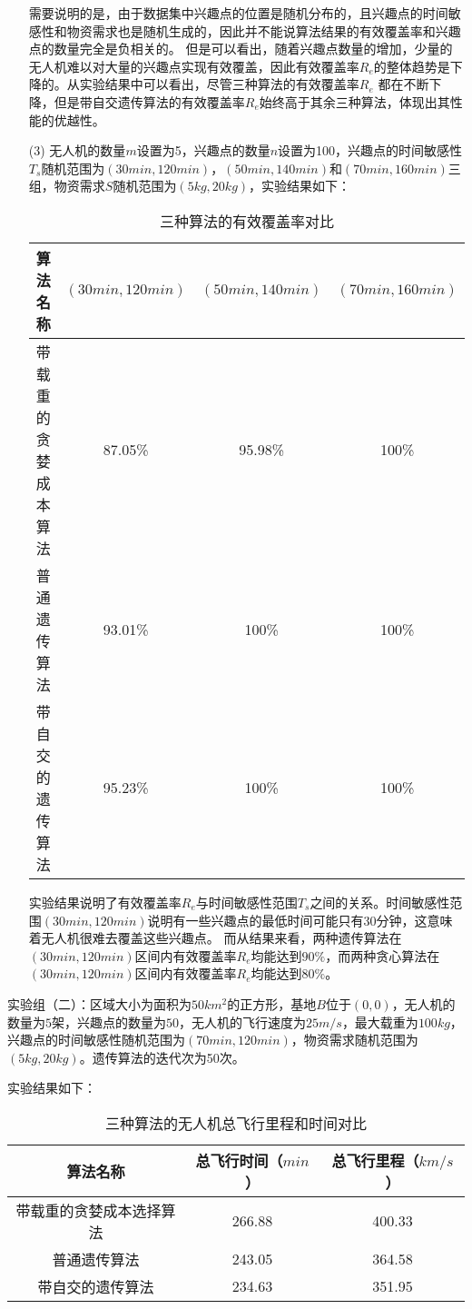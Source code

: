 \begin{itemize}
    需要说明的是，由于数据集中兴趣点的位置是随机分布的，且兴趣点的时间敏感性和物资需求也是随机生成的，因此并不能说算法结果的有效覆盖率和兴趣点的数量完全是负相关的。
    但是可以看出，随着兴趣点数量的增加，少量的无人机难以对大量的兴趣点实现有效覆盖，因此有效覆盖率$R_e$的整体趋势是下降的。从实验结果中可以看出，尽管三种算法的有效覆盖率$R_e$
    都在不断下降，但是带自交遗传算法的有效覆盖率$R_e$始终高于其余三种算法，体现出其性能的优越性。
    \item [(3)]无人机的数量$m$设置为5，兴趣点的数量$n$设置为100，兴趣点的时间敏感性$T_s$随机范围为$(30min,120min)$，$(50min,140min)$和$(70min,160min)$三组，物资需求$S$随机范围为$(5kg,20kg)$，实验结果如下：
    \begin{table}[htbp]
        \vspace{0.5em}\centering\wuhao
        \caption{三种算法的有效覆盖率对比}
        \begin{tabular}{cccc}
        \toprule[1.5pt]
        算法名称 & $(30min,120min)$ & $(50min,140min)$ & $(70min,160min)$ \\
        \midrule[1.5pt]
        带载重的贪婪成本 算法 & 87.05\% & 95.98\% & 100\%\\
        普通遗传算法 & 93.01\% & 100\% & 100\% \\
        带自交的遗传算法 & 95.23\% & 100\% & 100\% \\
        \bottomrule[1.5pt]
        \end{tabular}
        \end{table}
    
    
        实验结果说明了有效覆盖率$R_e$与时间敏感性范围$T_s$之间的关系。时间敏感性范围$(30min,120min)$说明有一些兴趣点的最低时间可能只有30分钟，这意味着无人机很难去覆盖这些兴趣点。
    而从结果来看，两种遗传算法在$(30min,120min)$区间内有效覆盖率$R_e$均能达到$90\%$，而两种贪心算法在$(30min,120min)$区间内有效覆盖率$R_e$均能达到$80\%$。
\end{itemize}


实验组（二）：区域大小为面积为$50km^2$的正方形，基地$B$位于$(0,0)$，无人机的数量为$5$架，兴趣点的数量为$50$，无人机的飞行速度为$25m/s$，最大载重为$100kg$，兴趣点的时间敏感性随机范围为$(70min,120min)$，物资需求随机范围为$(5kg,20kg)$。遗传算法的迭代次为50次。


实验结果如下：
\begin{table}[htbp]
    \vspace{0.5em}\centering\wuhao
    \caption{三种算法的无人机总飞行里程和时间对比}
    \begin{tabular}{ccc}
    \toprule[1.5pt]
    算法名称 & 总飞行时间（$min$） & 总飞行里程（$km/s$） \\
    \midrule[1.5pt]
    带载重的贪婪成本选择算法 & 266.88 & 400.33 \\
    普通遗传算法 & 243.05 & 364.58 \\
    带自交的遗传算法 & 234.63 & 351.95 \\
    \bottomrule[1.5pt]
    \end{tabular}
    \end{table}


